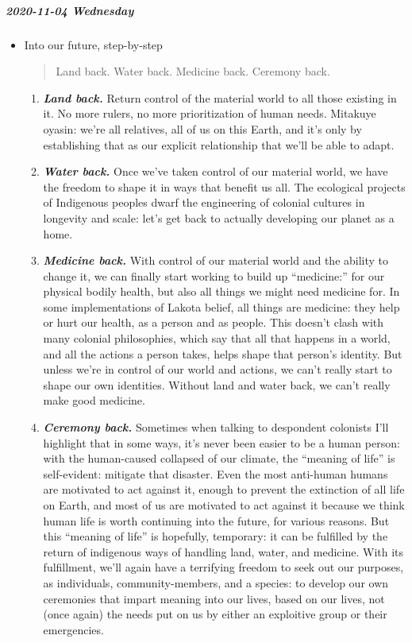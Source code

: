 \documentclass[11pt]{article}
\begin{document}
\subparagraph*{2020-11-04 Wednesday}
\label{sec:org33efb9b}
\begin{itemize}
\item Into our future, step-by-step
\label{sec:orge5ec523}
\begin{quote}
Land back. Water back. Medicine back. Ceremony back.
\end{quote}
\begin{enumerate}
\item \textbf{\emph{Land back.}} Return control of the material world to all those existing in it. No more rulers, no more prioritization of human needs. Mitakuye oyasin: we’re all relatives, all of us on this Earth, and it’s only by establishing that as our explicit relationship that we’ll be able to adapt.
\item \textbf{\emph{Water back.}} Once we’ve taken control of our material world, we have the freedom to shape it in ways that benefit us all. The ecological projects of Indigenous peoples dwarf the engineering of colonial cultures in longevity and scale: let’s get back to actually developing our planet as a home.
\item \textbf{\emph{Medicine back.}} With control of our material world and the ability to change it, we can finally start working to build up “medicine:” for our physical bodily health, but also all things we might need medicine for. In some implementations of Lakota belief, all things are medicine: they help or hurt our health, as a person and as people. This doesn’t clash with many colonial philosophies, which say that all that happens in a world, and all the actions a person takes, helps shape that person’s identity. But unless we’re in control of our world and actions, we can’t really start to shape our own identities. Without land and water back, we can’t really make good medicine.
\item \textbf{\emph{Ceremony back.}} Sometimes when talking to despondent colonists I’ll highlight that in some ways, it’s never been easier to be a human person: with the human-caused collapsed of our climate, the “meaning of life” is self-evident: mitigate that disaster. Even the most anti-human humans are motivated to act against it, enough to prevent the extinction of all life on Earth, and most of us are motivated to act against it because we think human life is worth continuing into the future, for various reasons. But this “meaning of life” is hopefully, temporary: it can be fulfilled by the return of indigenous ways of handling land, water, and medicine. With its fulfillment, we’ll again have a terrifying freedom to seek out our purposes, as individuals, community-members, and a species: to develop our own ceremonies that impart meaning into our lives, based on our lives, not (once again) the needs put on us by either an exploitive group or their emergencies.
\end{enumerate}


\end{itemize}
\end{document}
